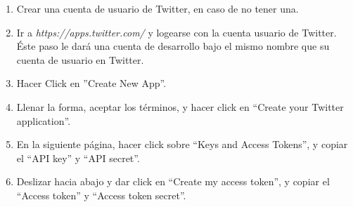 \begin{enumerate}[1.]
    \item Crear una cuenta de usuario de Twitter, en caso de no tener una. 
    \item Ir a \textit{https://apps.twitter.com/} y logearse con la cuenta usuario de Twitter. Éste paso le dará una cuenta de desarrollo bajo el mismo nombre que su cuenta de usuario en Twitter.
    \item Hacer Click en ''Create New App''.
    \item Llenar la forma, aceptar los términos, y hacer click en “Create your Twitter application”.
    \item En la siguiente página, hacer click sobre “Keys and Access Tokens”, y copiar el “API key” y “API secret”. 
    \item Deslizar hacia abajo y dar click en “Create my access token”, y copiar el “Access token” y “Access token secret”.
    
\end{enumerate}








